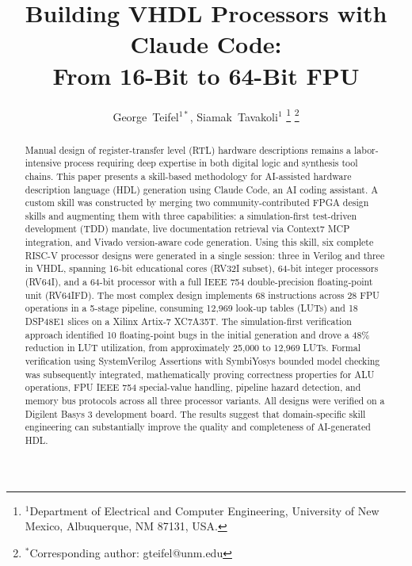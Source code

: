 \documentclass[journal]{IEEEtran}
\begin{document}
\title{Building VHDL Processors with Claude Code:\\From 16-Bit to 64-Bit FPU}

\author{George~Teifel$^{1*}$, Siamak~Tavakoli$^{1}$%
\thanks{$^{1}$Department of Electrical and Computer Engineering, University of New Mexico, Albuquerque, NM 87131, USA.}%
\thanks{$^{*}$Corresponding author: gteifel@unm.edu}}

\maketitle

\begin{abstract}
Manual design of register-transfer level (RTL) hardware descriptions remains a labor-intensive process requiring deep expertise in both digital logic and synthesis tool chains. This paper presents a skill-based methodology for AI-assisted hardware description language (HDL) generation using Claude Code, an AI coding assistant. A custom skill was constructed by merging two community-contributed FPGA design skills and augmenting them with three capabilities: a simulation-first test-driven development (TDD) mandate, live documentation retrieval via Context7 MCP integration, and Vivado version-aware code generation. Using this skill, six complete RISC-V processor designs were generated in a single session: three in Verilog and three in VHDL, spanning 16-bit educational cores (RV32I subset), 64-bit integer processors (RV64I), and a 64-bit processor with a full IEEE 754 double-precision floating-point unit (RV64IFD). The most complex design implements 68 instructions across 28 FPU operations in a 5-stage pipeline, consuming 12,969 look-up tables (LUTs) and 18 DSP48E1 slices on a Xilinx Artix-7 XC7A35T. The simulation-first verification approach identified 10 floating-point bugs in the initial generation and drove a 48\% reduction in LUT utilization, from approximately 25,000 to 12,969 LUTs. Formal verification using SystemVerilog Assertions with SymbiYosys bounded model checking was subsequently integrated, mathematically proving correctness properties for ALU operations, FPU IEEE 754 special-value handling, pipeline hazard detection, and memory bus protocols across all three processor variants. All designs were verified on a Digilent Basys 3 development board. The results suggest that domain-specific skill engineering can substantially improve the quality and completeness of AI-generated HDL.
\end{abstract}
\end{document}

